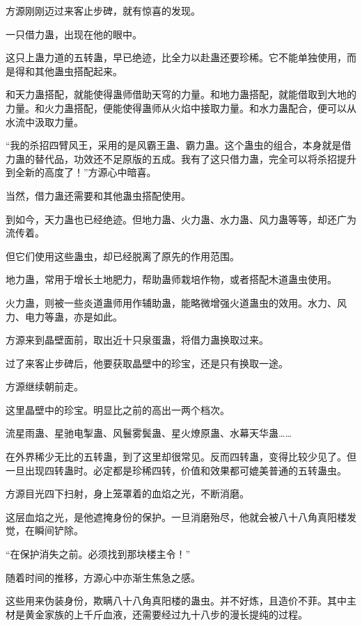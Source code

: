 
\begin{this_body}



方源刚刚迈过来客止步碑，就有惊喜的发现。

一只借力蛊，出现在他的眼中。

这只上蛊力道的五转蛊，早已绝迹，比全力以赴蛊还要珍稀。它不能单独使用，而是得和其他蛊虫搭配起来。

和天力蛊搭配，就能使得蛊师借助天穹的力量。和地力蛊搭配，就能借取到大地的力量。和火力蛊搭配，便能使得蛊师从火焰中接取力量。和水力蛊配合，便可以从水流中汲取力量。

“我的杀招四臂风王，采用的是风霸王蛊、霸力蛊。这个蛊虫的组合，本身就是借力蛊的替代品，功效还不足原版的五成。我有了这只借力蛊，完全可以将杀招提升到全新的高度了！”方源心中暗喜。

当然，借力蛊还需要和其他蛊虫搭配使用。

到如今，天力蛊也已经绝迹。但地力蛊、火力蛊、水力蛊、风力蛊等等，却还广为流传着。

但它们使用这些蛊虫，却已经脱离了原先的作用范围。

地力蛊，常用于增长土地肥力，帮助蛊师栽培作物，或者搭配木道蛊虫使用。

火力蛊，则被一些炎道蛊师用作辅助蛊，能略微增强火道蛊虫的效用。水力、风力、电力等蛊，亦是如此。

方源来到晶壁面前，取出近十只泉蛋蛊，将借力蛊换取过来。

过了来客止步碑后，他要获取晶壁中的珍宝，还是只有换取一途。

方源继续朝前走。

这里晶壁中的珍宝。明显比之前的高出一两个档次。

流星雨蛊、星驰电掣蛊、风鬟雾鬓蛊、星火燎原蛊、水幕天华蛊……

在外界稀少无比的五转蛊，到了这里却很常见。反而四转蛊，变得比较少见了。但一旦出现四转蛊时。必定都是珍稀四转，价值和效果都可媲美普通的五转蛊虫。

方源目光四下扫射，身上笼罩着的血焰之光，不断消磨。

这层血焰之光，是他遮掩身份的保护。一旦消磨殆尽，他就会被八十八角真阳楼发觉，在瞬间铲除。

“在保护消失之前。必须找到那块楼主令！”

随着时间的推移，方源心中亦渐生焦急之感。

这些用来伪装身份，欺瞒八十八角真阳楼的蛊虫。并不好炼，且造价不菲。其中主材是黄金家族的上千斤血液，还需要经过九十八步的漫长提纯的过程。


\end{this_body}
